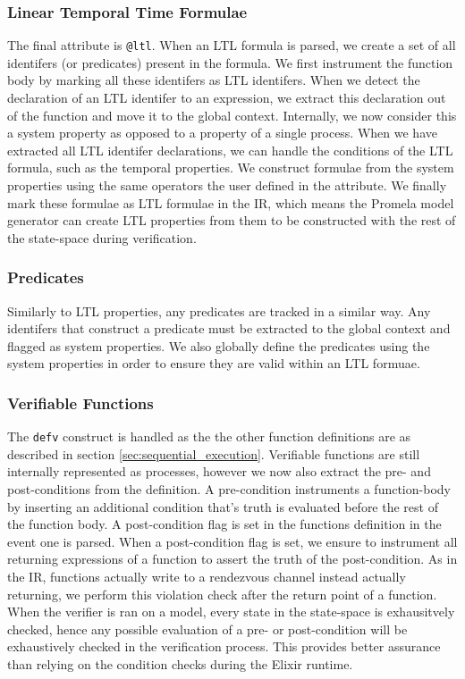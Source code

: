\subsubsection{Linear Temporal Time Formulae}
The final attribute is \texttt{@ltl}. When an LTL formula is parsed, we create a set of all identifers (or predicates) present in the formula. We first instrument the function body by marking all these identifers as LTL identifers. When we detect the declaration of an LTL identifer to an expression, we extract this declaration out of the function and move it to the global context. Internally, we now consider this a system property as opposed to a property of a single process. When we have extracted all LTL identifer declarations, we can handle the conditions of the LTL formula, such as the temporal properties. We construct formulae from the system properties using the same operators the user defined in the attribute. We finally mark these formulae as LTL formulae in the IR, which means the Promela model generator can create LTL properties from them to be constructed with the rest of the state-space during verification.
\par
\subsubsection{Predicates}
Similarly to LTL properties, any predicates are tracked in a similar way. Any identifers that construct a predicate must be extracted to the global context and flagged as system properties. We also globally define the predicates using the system properties in order to ensure they are valid within an LTL formuae.
\par
\subsubsection{Verifiable Functions}
The \texttt{defv} construct is handled as the the other function definitions are as described in section \ref{sec:sequential_execution}. Verifiable functions are still internally represented as processes, however we now also extract the pre- and post-conditions from the definition. A pre-condition instruments a function-body by inserting an additional condition that's truth is evaluated before the rest of the function body. A post-condition flag is set in the functions definition in the event one is parsed. When a post-condition flag is set, we ensure to instrument all returning expressions of a function to assert the truth of the post-condition. As in the IR, functions actually write to a rendezvous channel instead actually returning, we perform this violation check after the return point of a function. When the verifier is ran on a model, every state in the state-space is exhausitvely checked, hence any possible evaluation of a pre- or post-condition will be exhaustively checked in the verification process. This provides better assurance than relying on the condition checks during the Elixir runtime.

